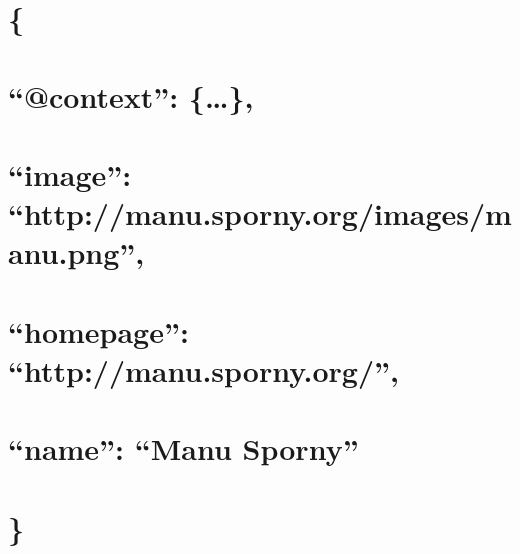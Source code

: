 \documentclass[
  letterpaper,
  DIV=11,
  numbers=noendperiod]{scrartcl}
\begin{document}
\hypertarget{section}{%
\section{\{}\label{section}}

\hypertarget{context}{%
\section{``@context'': \{\ldots\},}\label{context}}

\hypertarget{image-httpmanu.sporny.orgimagesmanu.png}{%
\section{``image'':
``http://manu.sporny.org/images/manu.png'',}\label{image-httpmanu.sporny.orgimagesmanu.png}}

\hypertarget{homepage-httpmanu.sporny.org}{%
\section{``homepage'':
``http://manu.sporny.org/'',}\label{homepage-httpmanu.sporny.org}}

\hypertarget{name-manu-sporny}{%
\section{``name'': ``Manu Sporny''}\label{name-manu-sporny}}

\hypertarget{section-1}{%
\section{\}}\label{section-1}}
\end{document}
